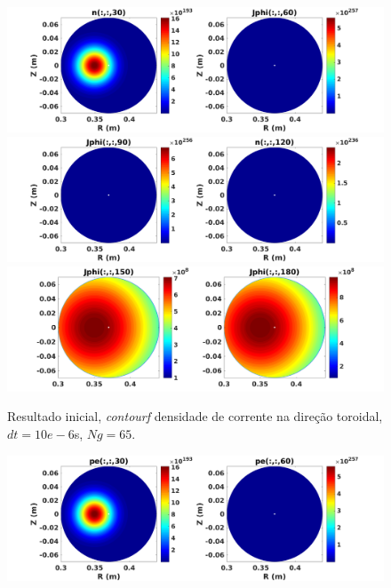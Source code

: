 \begin{frame}
\begin{figure}[H]
\label{simul201}
\begin{center}
\includegraphics[scale=0.5]{../SImulacao_breakdown/Adaptacao_nova/jtod1.png}  
\includegraphics[scale=0.5]{../SImulacao_breakdown/Adaptacao_nova/jtod2.png} 
\includegraphics[scale=0.5]{../SImulacao_breakdown/Adaptacao_nova/jtod3.png} 
\caption{Resultado inicial, \textit{contourf} densidade de corrente na direção toroidal, $dt=10e-6$s, $Ng = 65$.}
\end{center}
\end{figure}
\begin{figure}[H]
\label{simul201}
\begin{center}
\includegraphics[scale=0.5]{../SImulacao_breakdown/Adaptacao_nova/petod1.png}  

\end{center}
\end{figure}
\end{frame}
